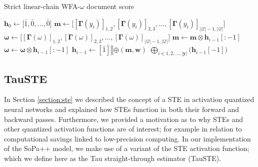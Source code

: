 \begin{algorithm}[t!]
  \small
  \caption{Strict linear-chain WFA-$\omega$ document score}
  \label{algo:lc_wfa_w_string_score}
  \begin{algorithmic}[1]
    \Statex
    \Begin
    \State $\bm{h}_0 \gets \big[\bar{1}, \bar{0}, \ldots, \bar{0}\big]$ 
     
    \State $\bm{m} \gets \big[[\bm{\Gamma}(y_i)]_{1,2}, [\bm{\Gamma}(y_i)]_{2,3}, \ldots,
    [\bm{\Gamma}(y_i)]_{|\mathcal{Q}|-1,|\mathcal{Q}|}\big]$ 
    \State $\bm{\omega} \gets \big[[\bm{\Gamma}(\omega)]_{1,2}, [\bm{\Gamma}(\omega)]_{2,3}, \ldots,
    [\bm{\Gamma}(\omega)]_{|\mathcal{Q}|-1,|\mathcal{Q}|}\big]$
    \State $\bm{m} \gets \bm{m} \otimes \bm{h}_{i-1}[:-1]$ 
    \State $\bm{\omega} \gets \bm{\omega} \otimes \bm{h}_{i-1}[:-1]$ 
    \State $\bm{h}_{i-1} \gets [\bar{1}] \mathbin\Vert \oplus(\bm{m}, \bm{w})$
    \EndFor
    \State \Return $\bigoplus_{i \in 1,2,...,|\bm{y}|}
    \big(\bm{h}_{i-1}[-1]\big)$ 
    \End
  \end{algorithmic}
\end{algorithm}

\subsection{TauSTE}

In Section \ref{section:ste} we described the concept of a STE in activation
quantized neural networks and explained how STEs function in both their forward
and backward passes. Furthermore, we provided a motivation as to why STEs and
other quantized activation functions are of interest; for example in relation to
computational savings linked to low-precision computing. In our implementation
of the SoPa++ model, we make use of a variant of the STE activation function;
which we define here as the Tau straight-through estimator (TauSTE).

